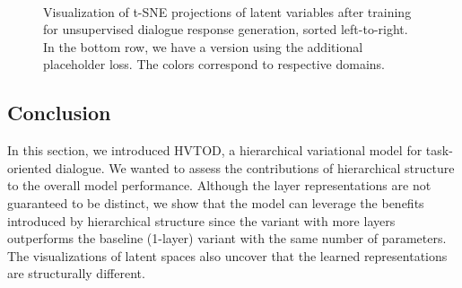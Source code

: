 \begin{figure}[h]
\hfill
{}\\
\caption{Visualization of t-SNE projections of latent variables after training for unsupervised dialogue response generation, sorted left-to-right. In the bottom row, we have a version using the additional placeholder loss. The colors correspond to respective domains.}
\label{05:fig:ft-layers}
\end{figure}

\subsection{Conclusion}
In this section, we introduced HVTOD, a hierarchical variational model for task-oriented dialogue.
We wanted to assess the contributions of hierarchical structure to the overall model performance.
Although the layer representations are not guaranteed to be distinct, we show that the model can leverage the benefits introduced by hierarchical structure since the variant with more layers outperforms the baseline (1-layer) variant with the same number of parameters.
The visualizations of latent spaces also uncover that the learned representations are structurally different.
